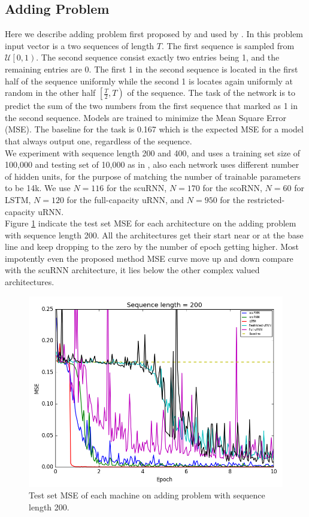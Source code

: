 \documentclass[letterpaper]{article} %
\begin{document}
\subsection{Adding Problem}

\noindent Here we describe adding problem first proposed by \cite{Arjo16} and used by \cite{kyle17}. In this problem input vector is a two sequences of length $T$. The first sequence is sampled from $\mathcal{U}\left[0,1\right).$ The second sequence consist exactly two entries being 1, and the remaining entries are 0. The first 1 in the second sequence is located in the first half of the sequence uniformly while the second 1 is locates again uniformly at random in the other half $\left[ \frac T 2 , T \right)$ of the sequence. The task of the network is to predict the sum of the two numbers from the first sequence that marked as 1 in the second sequence. Models are trained to minimize the Mean Square Error (MSE). The baseline for the task is 0.167 which is the expected MSE for a model that always output one, regardless of the sequence.\\

\noindent We experiment with sequence length 200 and 400, and uses a training set size of 100,000 and testing set of 10,000 as in \cite{kyle17}, also each network uses different number of hidden units, for the purpose of matching the number of trainable parameters to be 14k. We use $N = 116$ for the scuRNN, $N= 170$ for the scoRNN, $N= 60$ for LSTM, $N = 120$ for the full-capacity uRNN, and $N=950$ for the restricted-capacity uRNN.\\

\noindent Figure \ref{fig_addins_200} indicate the test set MSE for each architecture on the adding problem with sequence length 200. All the architectures get their start near or at the base line and keep dropping to the zero by the number of epoch getting higher. Most impotently even the proposed method MSE curve move up and down compare with the scuRNN architecture, it lies below the other complex valued architectures.\\



\begin{figure}
\centering
\includegraphics[width=0.8\linewidth]{adding_200.png}
  \caption{Test set MSE of each machine on adding problem with sequence length 200.}
  \label{fig_addins_200}
\end{figure}
\end{document}
